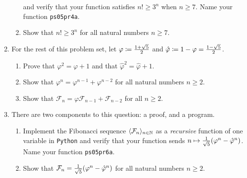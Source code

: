 \begin{enumerate}
\begin{enumerate}
                and verify that your function satisfies $n! \geq 3^n$ when $n \geq 7$.
                Name your function \texttt{ps05pr4a}.
            \item
                Show that $n! \geq 3^n$ for all natural numbers $n \geq 7$.
        \end{enumerate}
    \item
        For the rest of this problem set,
        let $\varphi \coloneqq \frac{1 + \sqrt{5}}{2}$
        and $\hat{\varphi} \coloneqq 1 - \varphi = \frac{1 - \sqrt{5}}{2}$.
        \begin{enumerate}
            \item
                Prove that $\varphi^2 = \varphi + 1$
                and that $\hat{\varphi}^2 = \hat{\varphi} + 1$.
            \item
                Show that $\varphi^n = \varphi^{n - 1} + \varphi^{n - 2}$
                for all natural numbers $n \geq 2$.
            \item
                Show that $\mathcal{F}_n = \varphi\mathcal{F}_{n - 1} + \mathcal{F}_{n - 2}$
                for all $n \geq 2$.
        \end{enumerate}
    \item
        There are two components to this question: a proof, and a program.
        \begin{enumerate}
            \item
                Implement the Fibonacci sequence $\langle \mathcal{F}_n \rangle_{n \in \mathbb{N}}$
                as a \emph{recursive} function of one variable in \texttt{Python}
                and verify that your function sends
                $n \mapsto \frac{1}{\sqrt{5}}\pn*{\varphi^n - \hat{\varphi}^n}$.
                Name your function \texttt{ps05pr6a}.
            \item
                Show that
                $\mathcal{F}_n = \frac{1}{\sqrt{5}}\pn*{\varphi^n - \hat{\varphi}^n}$
                for all natural numbers $n \geq 2$.
        \end{enumerate}
\end{enumerate}

